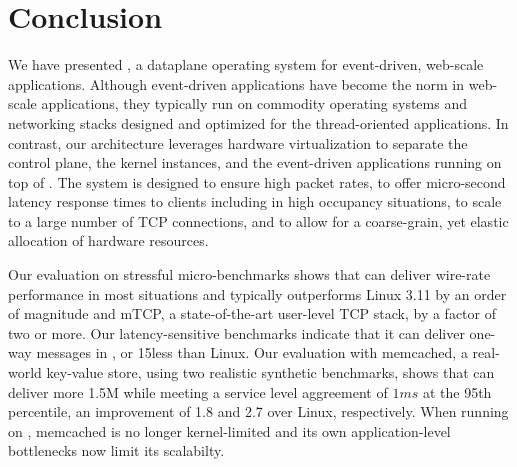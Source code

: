
\section{Conclusion}

We have presented \ix, a dataplane operating system for event-driven,
web-scale applications.  Although event-driven applications have
become the norm in web-scale applications, they typically run on
commodity operating systems and networking stacks designed and
optimized for the thread-oriented applications.  In contrast, our
architecture leverages hardware virtualization to separate the control
plane, the \ix kernel instances, and the event-driven applications
running on top of \ix.  The system is designed to ensure high packet
rates, to offer micro-second latency response times to clients
including in high occupancy situations, to scale to a large number of 
TCP connections, and to allow for a coarse-grain, yet
elastic allocation of hardware resources.

Our evaluation on stressful micro-benchmarks shows that \ix can
deliver wire-rate performance in most situations and typically
outperforms Linux 3.11 by an order of magnitude and mTCP, a
state-of-the-art user-level TCP stack, by a factor of two or more. Our
latency-sensitive benchmarks indicate that it can deliver one-way
messages in \microsecond, or 15\microsecond less than Linux.
Our evaluation with memcached, a real-world key-value store,
using two realistic synthetic benchmarks, shows that \ix can deliver
more \twiddle  1.5M while meeting a service level aggreement of $1ms$ at the
95th percentile, an improvement of 1.8 and 2.7 over Linux, respectively.
When running on \ix, memcached is no longer
kernel-limited and its own application-level bottlenecks now limit its
scalabilty.


